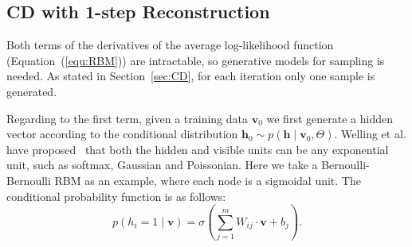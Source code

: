 \documentclass[11pt,twoside,a4paper]{article}
\begin{document}
\subsection{CD with 1-step Reconstruction}
\label{sec:cd}
	Both terms of the derivatives of the average log-likelihood function (Equation~(\ref{equ:RBM})) are intractable, so generative models for sampling is needed.
	As stated in Section~\ref{sec:CD}, for each iteration only one sample is generated.
	
	Regarding to the first term, given a training data $ \mathbf{v}_0 $ we first generate a hidden vector according to the conditional distribution $ \mathbf{h}_0 \sim p( \mathbf{h} \mid \mathbf{v}_0, \Theta) $.
	Welling et al. have proposed~\cite{welling2004exponential} that both the hidden and visible units can be any exponential unit, such as softmax, Gaussian and Poissonian.
	Here we take a Bernoulli-Bernoulli RBM as an example, where each node is a sigmoidal unit.
	The conditional probability function is as follows:
	\begin{equation}
		p(h_i = 1 \mid \mathbf{v}) = \sigma(\sum_{j=1}^{m} W_{ij} \cdot \mathbf{v} + b_j).
	\end{equation}
	
\end{document}
